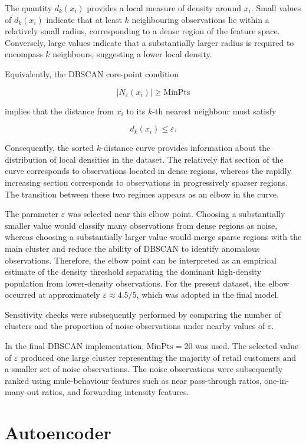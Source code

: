 The quantity $d_k(x_i)$ provides a local measure of density around $x_i$. Small values of $d_k(x_i)$ indicate that at least $k$ neighbouring observations lie within a relatively small radius, corresponding to a dense region of the feature space. Conversely, large values indicate that a substantially larger radius is required to encompass $k$ neighbours, suggesting a lower local density.

Equivalently, the DBSCAN core-point condition

\[
|N_{\varepsilon}(x_i)| \ge \text{MinPts}
\]

implies that the distance from $x_i$ to its $k$-th nearest neighbour must satisfy

\[
d_k(x_i) \le \varepsilon.
\]

Consequently, the sorted $k$-distance curve provides information about the distribution of local densities in the dataset. The relatively flat section of the curve corresponds to observations located in dense regions, whereas the rapidly increasing section corresponds to observations in progressively sparser regions. The transition between these two regimes appears as an elbow in the curve.

The parameter $\varepsilon$ was selected near this elbow point. Choosing a substantially smaller value would classify many observations from dense regions as noise, whereas choosing a substantially larger value would merge sparse regions with the main cluster and reduce the ability of DBSCAN to identify anomalous observations. Therefore, the elbow point can be interpreted as an empirical estimate of the density threshold separating the dominant high-density population from lower-density observations. For the present dataset, the elbow occurred at approximately $\varepsilon \approx 4.5/ 5$, which was adopted in the final model.

Sensitivity checks were subsequently performed by comparing the number of clusters and the proportion of noise observations under nearby values of $\varepsilon$.

In the final DBSCAN implementation, \(\text{MinPts}=20\) was used. The selected value of \(\varepsilon\) produced one large cluster representing the majority of retail customers and a smaller set of noise observations. The noise observations were subsequently ranked using mule-behaviour features such as near pass-through ratios, one-in-many-out ratios, and forwarding intensity features.

\section{Autoencoder}

